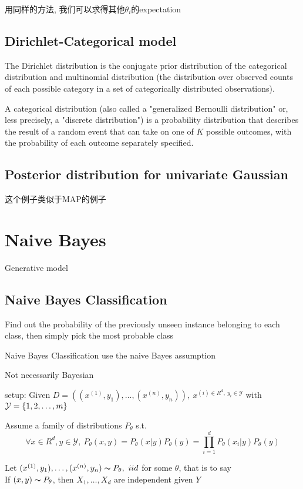 \documentclass{article}
\begin{document}
用同样的方法, 我们可以求得其他$\theta_i$的expectation

\subsection{Dirichlet-Categorical model}
The Dirichlet distribution is the conjugate prior distribution of the categorical distribution
and multinomial distribution (the distribution over observed counts of each possible category in a set of categorically distributed observations).

A categorical distribution (also called a "generalized Bernoulli distribution" or, less precisely, a "discrete distribution") 
is a probability distribution that describes the result of a random event that can take on one of $K$ possible outcomes, 
with the probability of each outcome separately specified.

\subsection{Posterior distribution for univariate Gaussian}
这个例子类似于MAP的例子

\section{Naive Bayes}
Generative model
\subsection{Naive Bayes Classification}
Find out the probability of the previously unseen instance belonging to each class, then simply pick the most probable class

Naive Bayes Classification use the naive Bayes assumption

Not necessarily Bayesian

setup: Given $D = ((x^{(1)}, y_1), \ldots, (x^{(n)}, y_n)),\ x^{(i) \in R^d,\ y_i \in \mathcal{Y}}$ with $\mathcal{Y} = \{1,2,\ldots, m\}$

Assume a family of distributions $P_\theta$ s.t.
$$\forall x \in R^d, y \in \mathcal{Y},\ P_\theta(x,y) = P_\theta(x|y) P_\theta(y) = \prod_{i=1}^d P_\theta(x_i|y) P_\theta(y)$$

Let $(x^{(1)}, y_1), \ldots, (x^{(n)}, y_n) \thicksim{P}_\theta,\ iid$ for some $\theta$, that is to say\\
If $(x,y) \thicksim{P}_\theta$, then $X_1, \ldots, X_d$ are independent given $Y$
\end{document}
